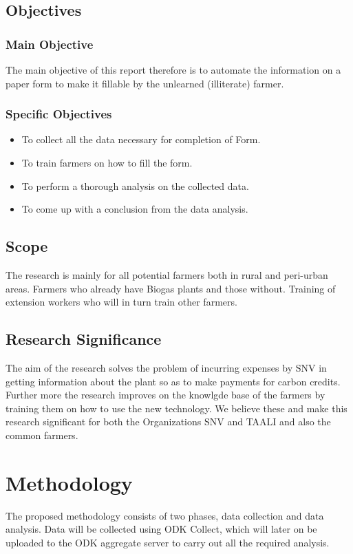 \documentclass[options]{article}
\begin{document}
\subsection{\textbf{Objectives}}


\subsubsection{\textbf{Main Objective}} 
The main objective of this report therefore is to automate the information on a paper form to make it fillable by the unlearned (illiterate) farmer.


\subsubsection{\textbf{Specific Objectives}}

\begin{itemize}
  \item To collect all the data necessary for completion of Form.
  \item To train farmers on how to fill the form.
  \item To perform a thorough analysis on the collected data.
  \item To come up with a conclusion from the data analysis.
\end{itemize}


\subsection{\textbf{Scope}}
The research is mainly for all potential farmers both in rural and peri-urban areas. Farmers who already have Biogas plants and those
without. Training of extension workers who will in turn train other farmers.

\subsection{\textbf{Research Significance}}
The aim of the research solves the problem of incurring expenses by SNV in getting information about the plant so as to make 
payments for carbon credits. Further more the research improves on the knowlgde base of the farmers by training them on how to 
use the new technology. We believe these and make this research significant for both the Organizations SNV and TAALI and also the 
common farmers.

\section{\textbf{Methodology}}
The proposed methodology consists of two phases, data collection and data analysis.\bigbreak
Data will be collected using ODK Collect, which will later on be uploaded to the ODK aggregate server to carry out all the required analysis.
\end{document}
